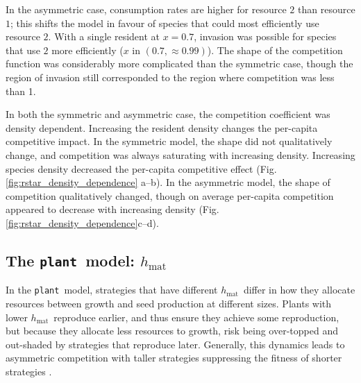 \documentclass[a4paper,11pt]{article}
\newcommand{\verify}[1]{{\color{navy}{(verify: #1)}}}
\newcommand{\todo}[1]{{\color{navy}{(todo: #1)}}}
\newcommand{\plant}{{\tt plant}}
\newcommand{\hmat}{\ensuremath{h_{\text{mat}}}}
\begin{document}
In the asymmetric case, consumption rates are higher for resource $2$ than resource $1$; this shifts the model in favour of species that could most efficiently use resource $2$. With a single resident at $x = 0.7$, invasion was possible for species that use $2$ more efficiently ($x$ in $(0.7, \approx 0.99)$). The shape of the competition function was considerably more complicated than the symmetric case, though the region of invasion still corresponded to the region where competition was less than 1.

\todo{DF can't recall how to interpret the figures for density dependence results. Need to revisit methods to ensure we understand how this is being calculated and that it aligns with the methods as described. }
In both the symmetric and asymmetric case, the competition coefficient was density dependent. \verify{what do we mean by this? shape of the competition function varied considerably with the density of the resident? Below we say it doesn't change. } Increasing the resident density changes the per-capita competitive impact. In the symmetric model, the shape did not qualitatively change, and competition was always saturating with increasing density. Increasing species density decreased the per-capita competitive effect (Fig. \ref{fig:rstar_density_dependence} a--b). In the asymmetric model, the shape of competition qualitatively changed, though on average per-capita competition appeared to decrease with increasing density (Fig. \ref{fig:rstar_density_dependence}c--d). 

\subsection{The \plant\ model: \hmat}

In the \plant\ model, strategies that have different \hmat\ differ in how they allocate resources between growth and seed production at different sizes. Plants with lower \hmat\ reproduce earlier, and thus ensure they achieve some reproduction, but because they allocate less resources to growth, risk being over-topped and out-shaded by strategies that reproduce later. Generally, this dynamics leads to asymmetric competition with taller strategies suppressing the fitness of shorter strategies \cite{Falster-2017}.
\end{document}
